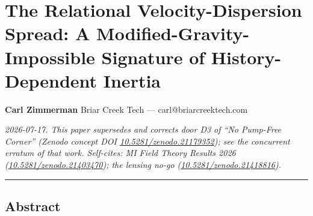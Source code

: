 \documentclass[
]{article}
\author{}
\date{}
\begin{document}
\section{The Relational Velocity-Dispersion Spread: A
Modified-Gravity-Impossible Signature of History-Dependent
Inertia}\label{the-relational-velocity-dispersion-spread-a-modified-gravity-impossible-signature-of-history-dependent-inertia}

\textbf{Carl Zimmerman} Briar Creek Tech --- carl@briarcreektech.com

\emph{2026-07-17. This paper supersedes and corrects door D3 of ``No
Pump-Free Corner'' (Zenodo concept DOI
\href{https://doi.org/10.5281/zenodo.21179352}{10.5281/zenodo.21179352});
see the concurrent erratum of that work. Self-cites: MI Field Theory
Results 2026
(\href{https://doi.org/10.5281/zenodo.21403470}{10.5281/zenodo.21403470});
the lensing no-go
(\href{https://doi.org/10.5281/zenodo.21418816}{10.5281/zenodo.21418816}).}

\begin{center}\rule{0.5\linewidth}{0.5pt}\end{center}

\subsection{Abstract}\label{abstract}
\end{document}
